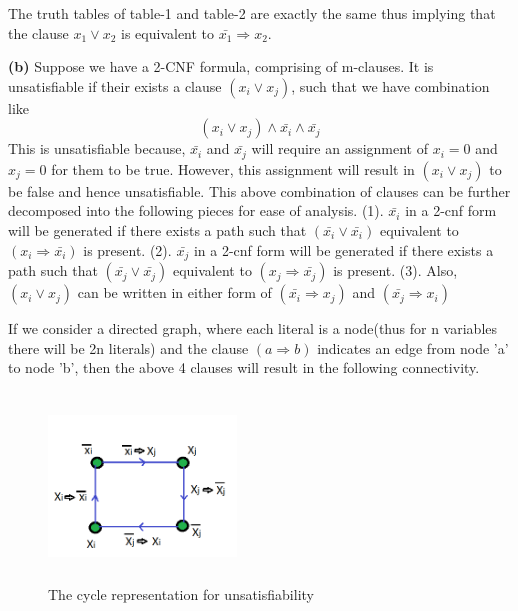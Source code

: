 \documentclass{article}
\renewcommand\part[1]{\vspace{.10in}\textbf{(#1)}}
\begin{document}
  The truth tables of table-1 and table-2 are exactly the same thus implying that the clause $x_{1} \vee x_{2}$ is equivalent to $\bar{x_{1}} \Rightarrow x_{2}$. \newline

  \part{b} Suppose we have a 2-CNF formula, comprising of m-clauses. It is unsatisfiable if their exists a clause $(x_{i} \vee x_{j})$, such that we have combination like \newline
\begin{equation}
   (x_{i} \vee x_{j})\wedge \bar{x_{i}} \wedge \bar{x_{j}}
\end{equation}
This is unsatisfiable because, $\bar{x_{i}}$ and $\bar{x_{j}}$  will require an assignment of $x_{i}=0$ and $x_{j} = 0$ for them to be true. However, this assignment will result in $(x_{i} \vee x_{j})$ to be false and hence unsatisfiable. This above combination of clauses can be further decomposed into the following pieces for ease of analysis. \newline
	\hspace*{0.5cm} (1). $\bar{x_{i}}$ in a 2-cnf form will be generated if there exists a path such that $(\bar{x_{i}} \vee \bar{x_{i}})$ equivalent to $(x_{i} \Rightarrow \bar{x_{i}})$ is present. \newline
      \hspace*{0.5cm} (2).  $\bar{x_{j}}$ in a 2-cnf form will be generated if there exists a path such that $(\bar{x_{j}} \vee \bar{x_{j}})$ equivalent to $(x_{j} \Rightarrow \bar{x_{j}})$ is present. \newline
	\hspace*{0.5cm} (3). Also, $(x_{i} \vee x_{j})$ can be written in either form of $(\bar{x_{i}} \Rightarrow x_{j})$ and $(\bar{x_{j}} \Rightarrow x_{i})$ \newline

If we consider a directed graph, where each literal is a node(thus for n variables there will be 2n literals) and the clause $(a \Rightarrow b)$ indicates an edge from node 'a' to node 'b', then the above 4 clauses will result in the following connectivity.\newline

  \begin{figure}[h!]
   \centering
  \includegraphics[width=5cm, height=5cm]{Prob1b}
  \caption{The cycle representation for unsatisfiability}
  \end{figure}
\end{document}
